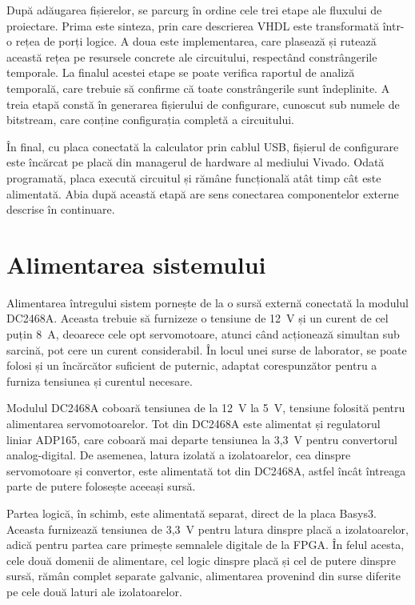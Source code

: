 După adăugarea fișierelor, se parcurg în ordine cele trei etape ale fluxului de
proiectare. Prima este sinteza, prin care descrierea VHDL este transformată într-o rețea
de porți logice. A doua este implementarea, care plasează și rutează această rețea pe
resursele concrete ale circuitului, respectând constrângerile temporale. La finalul
acestei etape se poate verifica raportul de analiză temporală, care trebuie să confirme
că toate constrângerile sunt îndeplinite. A treia etapă constă în generarea fișierului de
configurare, cunoscut sub numele de bitstream, care conține configurația completă a
circuitului.

În final, cu placa conectată la calculator prin cablul USB, fișierul de configurare este
încărcat pe placă din managerul de hardware al mediului Vivado. Odată programată, placa
execută circuitul și rămâne funcțională atât timp cât este alimentată. Abia după această
etapă are sens conectarea componentelor externe descrise în continuare.

\section{Alimentarea sistemului}
\label{sec:manual-alimentare}

Alimentarea întregului sistem pornește de la o sursă externă conectată la modulul
DC2468A. Aceasta trebuie să furnizeze o tensiune de 12~V și un curent de cel puțin 8~A,
deoarece cele opt servomotoare, atunci când acționează simultan sub sarcină, pot cere
un curent considerabil. În locul unei surse de laborator, se poate folosi și un
încărcător suficient de puternic, adaptat corespunzător pentru a furniza tensiunea și
curentul necesare.

Modulul DC2468A coboară tensiunea de la 12~V la 5~V, tensiune folosită pentru
alimentarea servomotoarelor. Tot din DC2468A este alimentat și regulatorul liniar
ADP165, care coboară mai departe tensiunea la 3,3~V pentru convertorul analog-digital.
De asemenea, latura izolată a izolatoarelor, cea dinspre servomotoare și convertor,
este alimentată tot din DC2468A, astfel încât întreaga parte de putere folosește aceeași
sursă.

Partea logică, în schimb, este alimentată separat, direct de la placa Basys3. Aceasta
furnizează tensiunea de 3,3~V pentru latura dinspre placă a izolatoarelor, adică pentru
partea care primește semnalele digitale de la FPGA. În felul acesta, cele două domenii
de alimentare, cel logic dinspre placă și cel de putere dinspre sursă, rămân complet
separate galvanic, alimentarea provenind din surse diferite pe cele două laturi ale
izolatoarelor.

